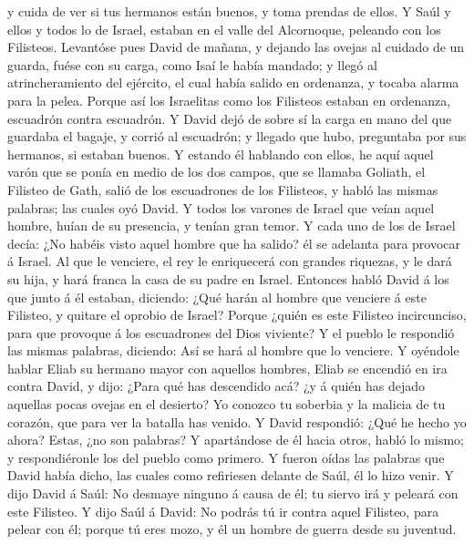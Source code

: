 y cuida de ver si tus hermanos están buenos, y toma prendas de ellos.
 Y Saúl y ellos y todos lo de Israel, estaban en el valle
del Alcornoque, peleando con los Filisteos.  Levantóse
pues David de mañana, y dejando las ovejas al cuidado de un guarda,
fuése con su carga, como Isaí le había mandado; y llegó al
atrincheramiento del ejército, el cual había salido en ordenanza, y
tocaba alarma para la pelea.  Porque así los Israelitas
como los Filisteos estaban en ordenanza, escuadrón contra escuadrón.
 Y David dejó de sobre sí la carga en mano del que
guardaba el bagaje, y corrió al escuadrón; y llegado que hubo,
preguntaba por sus hermanos, si estaban buenos.  Y
estando él hablando con ellos, he aquí aquel varón que se ponía en medio
de los dos campos, que se llamaba Goliath, el Filisteo de Gath, salió de
los escuadrones de los Filisteos, y habló las mismas palabras; las
cuales oyó David.  Y todos los varones de Israel que
veían aquel hombre, huían de su presencia, y tenían gran temor.
 Y cada uno de los de Israel decía: ¿No habéis visto
aquel hombre que ha salido? él se adelanta para provocar á Israel. Al
que le venciere, el rey le enriquecerá con grandes riquezas, y le dará
su hija, y hará franca la casa de su padre en Israel. 
Entonces habló David á los que junto á él estaban, diciendo: ¿Qué harán
al hombre que venciere á este Filisteo, y quitare el oprobio de Israel?
Porque ¿quién es este Filisteo incircunciso, para que provoque á los
escuadrones del Dios viviente?  Y el pueblo le respondió
las mismas palabras, diciendo: Así se hará al hombre que lo venciere.
 Y oyéndole hablar Eliab su hermano mayor con aquellos
hombres, Eliab se encendió en ira contra David, y dijo: ¿Para qué has
descendido acá? ¿y á quién has dejado aquellas pocas ovejas en el
desierto? Yo conozco tu soberbia y la malicia de tu corazón, que para
ver la batalla has venido.  Y David respondió: ¿Qué he
hecho yo ahora? Estas, ¿no son palabras?  Y apartándose
de él hacia otros, habló lo mismo; y respondiéronle los del pueblo como
primero.  Y fueron oídas las palabras que David había
dicho, las cuales como refiriesen delante de Saúl, él lo hizo venir.
 Y dijo David á Saúl: No desmaye ninguno á causa de él;
tu siervo irá y peleará con este Filisteo.  Y dijo Saúl á
David: No podrás tú ir contra aquel Filisteo, para pelear con él; porque
tú eres mozo, y él un hombre de guerra desde su juventud.
